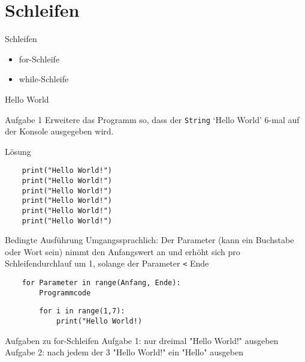 \section{Schleifen}

\begin{frame}{Schleifen}
\begin{itemize}
	\item for-Schleife
	\item while-Schleife
\end{itemize}
\end{frame}


\begin{frame}[fragile]{Hello World}
\begin{block}{Aufgabe 1}
	Erweitere das Programm so, dass der \texttt{String} `Hello World'
	6-mal auf der Konsole ausgegeben wird.
\end{block}
\pause{}
\begin{exampleblock}{Lösung}
	\begin{lstlisting}
	print("Hello World!")
	print("Hello World!")
	print("Hello World!")
	print("Hello World!")
	print("Hello World!")
	print("Hello World!")
	\end{lstlisting}
\end{exampleblock}
\end{frame}


\begin{frame}[fragile]{Bedingte Ausführung}
	Umgangssprachlich: Der Parameter (kann ein Buchstabe oder Wort sein) nimmt den Anfangswert an und erhöht sich pro Schleifendurchlauf um 1, solange der Parameter \texttt{<} Ende
	
	\begin{lstlisting}
	for Parameter in range(Anfang, Ende):
		Programmcode
	\end{lstlisting}
	
	\begin{lstlisting}
		for i in range(1,7):
			print("Hello World!)
	\end{lstlisting}	
\end{frame}

\begin{frame}[fragile]{Aufgaben zu for-Schleifen}
Aufgabe 1: nur dreimal "Hello World!" ausgeben
Aufgabe 2: nach jedem der 3 "Hello World!" ein "Hello" ausgeben
\end{frame}


